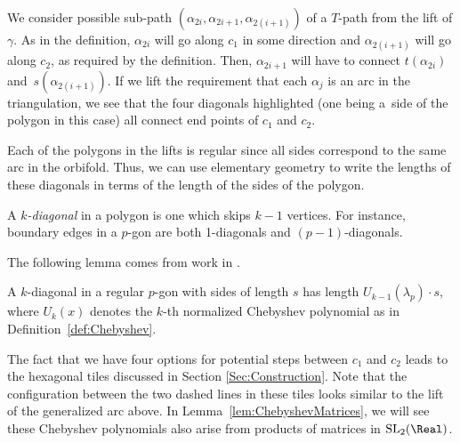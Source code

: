 \begin{center}
\end{center}

We consider possible sub-path $(\alpha_{2i},\alpha_{2i+1}, \alpha_{2(i+1)})$ of a $T$-path from the lift of $\gamma$. As in the definition, $\alpha_{2i}$ will go along $c_1$ in some direction and $\alpha_{2(i+1)}$ will go along $c_2$, as required by the definition. Then, $\alpha_{2i+1}$ will have to connect $t(\alpha_{2i})$ and~$s(\alpha_{2(i+1)})$. If we lift the requirement that each $\alpha_j$ is an arc in the triangulation, we see that the four diagonals highlighted (one being a~side of the polygon in this case) all connect end points of $c_1$ and $c_2$.

Each of the polygons in the lifts is regular since all sides correspond to the same arc in the orbifold. Thus, we can use elementary geometry to write the lengths of these diagonals in terms of the length of the sides of the polygon.

\begin{Definition}\label{def:kdiagonal}
A \emph{$k$-diagonal} in a polygon is one which skips $k-1$ vertices. For instance, boundary edges in a $p$-gon are both 1-diagonals and $(p-1)$-diagonals.
\end{Definition}

The following lemma comes from work in \cite{Lang}.

\begin{Lemma} \label{lem:polygonlength}
A $k$-diagonal in a regular $p$-gon with sides of length $s$ has length $U_{k-1}(\lambda_p) \cdot s$, where $U_k(x)$ denotes the $k$-th normalized Chebyshev polynomial as in Definition~{\rm \ref{def:Chebyshev}}.
\end{Lemma}

The fact that we have four options for potential steps between $c_1$ and $c_2$ leads to the hexagonal tiles discussed in Section \ref{Sec:Construction}. Note that the configuration between the two dashed lines in these tiles looks similar to the lift of the generalized arc above. In Lemma~\ref{lem:ChebyshevMatrices}, we will see these Chebyshev polynomials also arise from products of matrices in ${\rm SL}_2(\Real)$.

